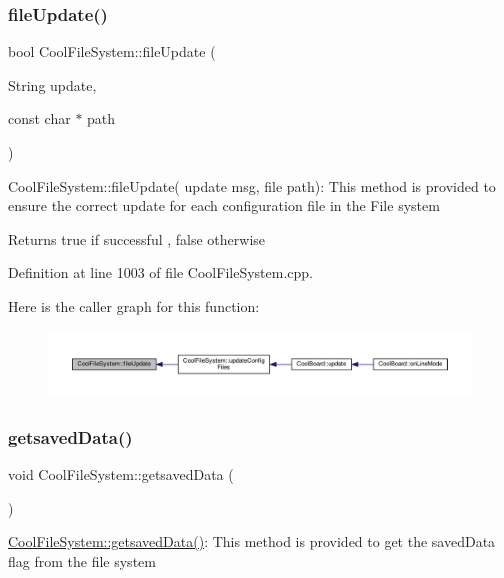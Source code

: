 \subsubsection{\texorpdfstring{file\+Update()}{fileUpdate()}}
{\footnotesize\ttfamily bool Cool\+File\+System\+::file\+Update (\begin{DoxyParamCaption}\item[{String}]{update,  }\item[{const char $\ast$}]{path }\end{DoxyParamCaption})}

Cool\+File\+System\+::file\+Update( update msg, file path)\+: This method is provided to ensure the correct update for each configuration file in the File system

\begin{DoxyReturn}{Returns}
true if successful , false otherwise 
\end{DoxyReturn}


Definition at line 1003 of file Cool\+File\+System.\+cpp.

Here is the caller graph for this function\+:\nopagebreak
\begin{figure}[H]
\begin{center}
\leavevmode
\includegraphics[width=350pt]{class_cool_file_system_a13f2958f5b87757c31fc53797a30d23a_icgraph}
\end{center}
\end{figure}
\mbox{\label{class_cool_file_system_a70701d05e811604af1b531f4f6dc69ed}} 
\subsubsection{\texorpdfstring{getsaved\+Data()}{getsavedData()}}
{\footnotesize\ttfamily void Cool\+File\+System\+::getsaved\+Data (\begin{DoxyParamCaption}{ }\end{DoxyParamCaption})}

\hyperlink{class_cool_file_system_a70701d05e811604af1b531f4f6dc69ed}{Cool\+File\+System\+::getsaved\+Data()}\+: This method is provided to get the saved\+Data flag from the file system 

